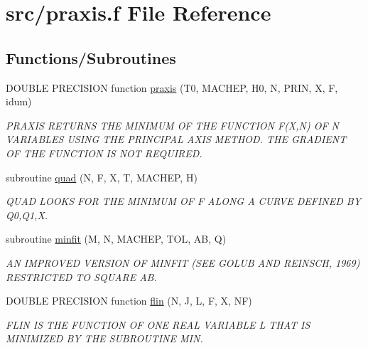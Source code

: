 \hypertarget{praxis_8f}{\section{src/praxis.f File Reference}
\label{praxis_8f}
}
\subsection*{Functions/\-Subroutines}
\begin{DoxyCompactItemize}
\item 
D\-O\-U\-B\-L\-E P\-R\-E\-C\-I\-S\-I\-O\-N function \hyperlink{praxis_8f_af91941b7f0c3ddb787c772ca565e1855}{praxis} (T0, M\-A\-C\-H\-E\-P, H0, N, P\-R\-I\-N, X, F, idum)
\begin{DoxyCompactList}\small\item\em P\-R\-A\-X\-I\-S R\-E\-T\-U\-R\-N\-S T\-H\-E M\-I\-N\-I\-M\-U\-M O\-F T\-H\-E F\-U\-N\-C\-T\-I\-O\-N F(\-X,\-N) O\-F N V\-A\-R\-I\-A\-B\-L\-E\-S U\-S\-I\-N\-G T\-H\-E P\-R\-I\-N\-C\-I\-P\-A\-L A\-X\-I\-S M\-E\-T\-H\-O\-D. T\-H\-E G\-R\-A\-D\-I\-E\-N\-T O\-F T\-H\-E F\-U\-N\-C\-T\-I\-O\-N I\-S N\-O\-T R\-E\-Q\-U\-I\-R\-E\-D. \end{DoxyCompactList}\item 
subroutine \hyperlink{praxis_8f_a0527d011f50eb026ac3ceea522e0ca5a}{quad} (N, F, X, T, M\-A\-C\-H\-E\-P, H)
\begin{DoxyCompactList}\small\item\em Q\-U\-A\-D L\-O\-O\-K\-S F\-O\-R T\-H\-E M\-I\-N\-I\-M\-U\-M O\-F F A\-L\-O\-N\-G A C\-U\-R\-V\-E D\-E\-F\-I\-N\-E\-D B\-Y Q0,Q1,X. \end{DoxyCompactList}\item 
subroutine \hyperlink{praxis_8f_a4deca9e8eeda59dc7ea99e26c38d4a6d}{minfit} (M, N, M\-A\-C\-H\-E\-P, T\-O\-L, A\-B, Q)
\begin{DoxyCompactList}\small\item\em A\-N I\-M\-P\-R\-O\-V\-E\-D V\-E\-R\-S\-I\-O\-N O\-F M\-I\-N\-F\-I\-T (S\-E\-E G\-O\-L\-U\-B A\-N\-D R\-E\-I\-N\-S\-C\-H, 1969) R\-E\-S\-T\-R\-I\-C\-T\-E\-D T\-O S\-Q\-U\-A\-R\-E A\-B. \end{DoxyCompactList}\item 
D\-O\-U\-B\-L\-E P\-R\-E\-C\-I\-S\-I\-O\-N function \hyperlink{praxis_8f_a8e1d4a20be8141e78ebb31fd1dc876dd}{flin} (N, J, L, F, X, N\-F)
\begin{DoxyCompactList}\small\item\em F\-L\-I\-N I\-S T\-H\-E F\-U\-N\-C\-T\-I\-O\-N O\-F O\-N\-E R\-E\-A\-L V\-A\-R\-I\-A\-B\-L\-E L T\-H\-A\-T I\-S M\-I\-N\-I\-M\-I\-Z\-E\-D B\-Y T\-H\-E S\-U\-B\-R\-O\-U\-T\-I\-N\-E M\-I\-N. \end{DoxyCompactList}\item 

\end{DoxyCompactItemize}
